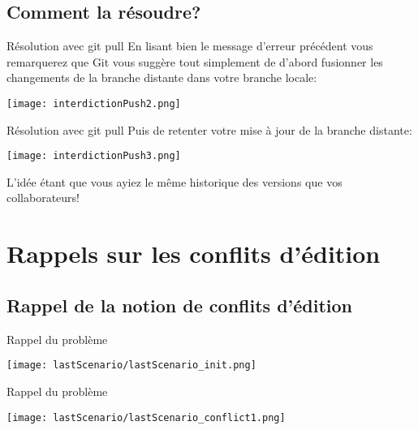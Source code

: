 \documentclass{beamer}
\begin{document}
\subsection{Comment la résoudre?}
\begin{frame}{Résolution avec git pull}
En lisant bien le message d'erreur précédent vous remarquerez que Git vous suggère tout simplement de d'abord fusionner les changements de la branche distante dans votre branche locale:
\begin{center}
	\texttt{[image: interdictionPush2.png]}
\end{center}
\end{frame}

\begin{frame}{Résolution avec git pull}
Puis de retenter votre mise à jour de la branche distante:
\begin{center}
	\texttt{[image: interdictionPush3.png]}
\end{center}
L'idée étant que vous ayiez le même historique des versions que vos collaborateurs!
\end{frame}





\section{Rappels sur les conflits d'édition}

\subsection{Rappel de la notion de conflits d'édition}
\begin{frame}{Rappel du problème}
\begin{center}
    \texttt{[image: lastScenario/lastScenario\_init.png]}
\end{center}
\end{frame}

\begin{frame}{Rappel du problème}
\begin{center}
    \texttt{[image: lastScenario/lastScenario\_conflict1.png]}
\end{center}
\end{frame}
\end{document}
